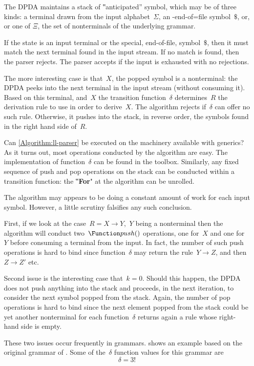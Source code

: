 The DPDA maintains a stack of ‟anticipated” symbol, which may
  be of three kinds: a terminal drawn from the input alphabet~$Σ$,
  an -end-of=file symbol~$\$$, or, 
  or one of $Ξ$, the set of nonterminals of the underlying
  grammar.

If the state is an input terminal or the special, end-of-file,
  symbol~$\$$, then it must match
  the next terminal found in the input stream.
If no match is found, then the parser rejects.
The parser accepts if the input is exhausted with
  no rejections.

The more interesting case is that~$X$, the popped symbol
  is a nonterminal: the DPDA peeks into the next terminal in the input
  stream (without consuming it).
Based on this terminal, and~$X$ the transition function~$δ$
  determines~$R$ the derivation rule to use in order to derive~$X$.
The algorithm rejects if~$δ$ can offer no such rule.
Otherwise, it pushes into the stack, in reverse order, the symbols
  found in the right hand side of~$R$.

Can \cref{Algorithm:ll-parser} be executed on the machinery
  available with \Java generics?
As it turns out, most operations conducted by the algorithm
  are easy.
The implementation of function~$δ$ can
  be found in the toolbox.
Similarly, any fixed sequence of push and pop
  operations on the stack can be conducted within a \Java
  transition function:
  the ‟\textbf{For}" at the algorithm can be unrolled.

The algorithm may appears to be doing a constant amount
  of work for each input symbol.
However, a little scrutiny falsifies any such conclusion.

First, if we look at the case~$R=X→Y$,~$Y$
  being a nonterminal then the algorithm will conduct two~$\Function push()$ operations,
  one for~$X$ and one for~$Y$ before consuming a terminal from the input.
In fact, the number of such push operations is hard to bind since function~$δ$ may
  return the rule~$Y→Z$, and then~$Z→Z'$ etc.

Second issue is the interesting case that~$k=0$.
Should this happen, the DPDA does not push anything into the stack
  and proceeds, in the next iteration, to consider the next symbol
  popped from the stack.
Again, the number of pop operations is hard to bind since the next element
  popped from the stack could be yet another nonterminal for each function~$δ$
  returns again a rule whose right-hand side is empty.

These two issues occur frequently in grammars.
 shows an example based on the original
  grammar of \Pascal {}.
Some of the~$δ$ function values for this grammar are
\begin{equation}
δ = 3 !
\end{equation}

